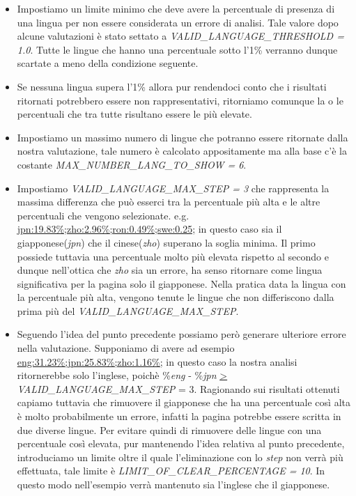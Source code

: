 \documentclass{article}
\newcommand{\function}[1]{\textit{#1}}
\newcommand{\mintedstyle}[1]{\url{#1}}
\begin{document}
\begin{itemize}
    \item Impostiamo un limite minimo che deve avere la percentuale di presenza di una lingua per non essere considerata un errore di analisi. Tale valore dopo alcune valutazioni è stato settato a \function{VALID\_LANGUAGE\_THRESHOLD = 1.0}. Tutte le lingue che hanno una percentuale sotto l'1\% verranno dunque scartate a meno della condizione seguente.
    \item Se nessuna lingua supera l'1\% allora pur rendendoci conto che i risultati ritornati potrebbero essere non rappresentativi, ritorniamo comunque la o le percentuali che tra tutte risultano essere le più elevate.
    \item Impostiamo un massimo numero di lingue che potranno essere ritornate dalla nostra valutazione, tale numero è calcolato appositamente ma alla base c'è la costante \function{MAX\_NUMBER\_LANG\_TO\_SHOW = 6}.
    \item Impostiamo \function{VALID\_LANGUAGE\_MAX\_STEP = 3} che rappresenta la massima differenza che può esserci tra la percentuale più alta e le altre percentuali che vengono selezionate. e.g. \mintedstyle{jpn:19.83\%;zho:2.96\%;ron:0.49\%;swe:0.25;} in questo caso sia il giapponese(\textit{jpn}) che il cinese(\textit{zho}) superano la soglia minima. Il primo possiede tuttavia una percentuale molto più elevata rispetto al secondo e dunque nell'ottica che \textit{zho} sia un errore, ha senso ritornare come lingua significativa per la pagina solo il giapponese. Nella pratica data la lingua con la percentuale più alta, vengono tenute le lingue che non differiscono dalla prima più del \function{VALID\_LANGUAGE\_MAX\_STEP}.
    \item Seguendo l'idea del punto precedente possiamo però generare ulteriore errore nella valutazione. Supponiamo di avere ad esempio \mintedstyle{eng:31.23\%;jpn:25.83\%;zho:1.16\%;} in questo caso la nostra analisi ritornerebbe solo l'inglese, poichè \%\textit{eng} - \%\textit{jpn} \mintedstyle{>} \function{VALID\_LANGUAGE\_MAX\_STEP} = 3. Ragionando sui risultati ottenuti capiamo tuttavia che rimuovere il giapponese che ha una percentuale così alta è molto probabilmente un errore, infatti la pagina potrebbe essere scritta in due diverse lingue. Per evitare quindi di rimuovere delle lingue con una percentuale così elevata, pur mantenendo l'idea relativa al punto precedente, introduciamo un limite oltre il quale l'eliminazione con lo \textit{step} non verrà più effettuata, tale limite è \function{LIMIT\_OF\_CLEAR\_PERCENTAGE = 10}. In questo modo nell'esempio verrà mantenuto sia l'inglese che il giapponese.
\end{itemize}
\end{document}
